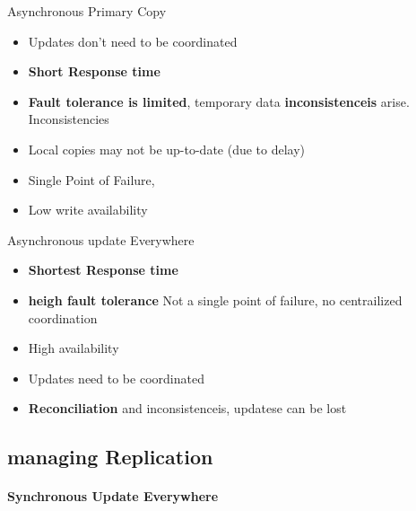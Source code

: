 \documentclass[a4paper,12pt]{article}%
\begin{document}
 Asynchronous Primary Copy
 
 {\color[HTML]{9AB299} 
 \begin{itemize}
  \item Updates don't need to be coordinated
  \item {\bf Short Response time}
 \end{itemize}

 }   
{\color[HTML]{A38C8C}
 \begin{itemize}
 \item {\bf Fault tolerance is limited}, temporary data {\bf inconsistenceis} arise. Inconsistencies 
 \item Local copies may not be up-to-date (due to delay)
 \item Single Point of Failure,
 \item Low write availability
 \end{itemize}
 }

 
 
 Asynchronous update Everywhere
 
 {\color[HTML]{9AB299} 
 \begin{itemize}
  \item {\bf Shortest Response time}
  \item {\bf heigh fault tolerance} Not a single point of failure, no centrailized coordination
  \item High availability
 \end{itemize}

 }   
{\color[HTML]{A38C8C}
 \begin{itemize}
 \item Updates need to be coordinated
 \item {\bf Reconciliation} and inconsistenceis, updatese can be lost 
 \end{itemize}
 }
 
 
 
 
 \fi
 
 
 \subsection{managing Replication}
 
 
 
 
 
 \paragraph{Synchronous Update Everywhere}
 
\end{document}
